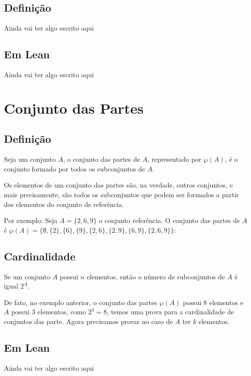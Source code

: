   \subsection{Definição}
  Ainda vai ter algo escrito aqui

  \subsection{Em Lean}
  Ainda vai ter algo escrito aqui

\section{Conjunto das Partes}

\subsection{Definição}
Seja um conjunto $A$, o conjunto das partes de $A$, representado por $\wp(A)$, é o conjunto formado por todos os subconjuntos de $A$.

Os elementos de um conjunto das partes são, na verdade, outros conjuntos, e mais precisamente, são todos os subconjuntos que podem ser formados a partir dos elementos do conjunto de referência.

Por exemplo:  Seja $A = \{2,6,9\}$ o conjunto referência.
O conjunto das partes de $A$ é $\wp(A)
= \{\emptyset,\{2\},\{6\},\{9\},\{2,6\},\{2,9\},\{6,9\},\{2,6,9\}\}$:

\subsection{Cardinalidade}
Se um conjunto $A$ possui $n$ elementos, então o número de subconjuntos de $A$ é igual $2^A$.

De fato, no exemplo anterior, o conjunto das partes $\wp(A)$ possui 8 elementos e $A$ possui 3 elementos, como $2^3 = 8$, temos uma prova para a cardinalidade de conjuntos das parte.
Agora precisamos provar no caso de $A$ ter $k$ elementos.


\subsection{Em Lean}
Ainda vai ter algo escrito aqui

